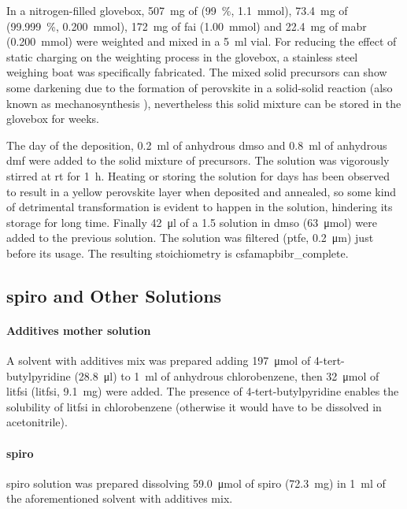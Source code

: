 		In a nitrogen-filled glovebox, \SI{507}{\mg} of  (\SI{99}{\%}, \SI{1.1}{\mmol}), \SI{73.4}{\mg} of  (\SI{99.999}{\%}, \SI{0.200}{\mmol}), \SI{172}{\mg} of \gls{fai} (\SI{1.00}{\mmol}) and \SI{22.4}{\mg} of \gls{mabr} (\SI{0.200}{\mmol}) were weighted and mixed in a \SI{5}{\ml} vial.
		For reducing the effect of static charging on the weighting process in the glovebox, a stainless steel weighing boat was specifically fabricated.
		The mixed solid precursors can show some darkening due to the formation of perovskite in a solid-solid reaction (also known as mechanosynthesis \cite{Prochowicz2018}), nevertheless this solid mixture can be stored in the glovebox for weeks.

		The day of the deposition, \SI{0.2}{\ml} of anhydrous \gls{dmso} and \SI{0.8}{\ml} of anhydrous \gls{dmf} were added to the solid mixture of precursors.
		The solution was vigorously stirred at \gls{rt} for \SI{1}{\hour}.
		Heating or storing the solution for days has been observed to result in a yellow perovskite layer when deposited and annealed, so some kind of detrimental transformation is evident to happen in the solution, hindering its storage for long time.
		Finally \SI{42}{\ul} of	a \SI{1.5}{\Molar}  solution in \gls{dmso} (\SI{63}{\umol}) were added to the previous solution.
		The solution was filtered (\gls{ptfe}, \SI{0.2}{\um}) just before its usage.
		The resulting stoichiometry is \acrshort{csfamapbibr_complete}.

	\subsection{\Gls{spiro} and Other  Solutions}

		\paragraph{Additives mother solution}
		A solvent with additives mix was prepared adding \SI{197}{\umol} of 4-tert-butylpyridine (\SI{28.8}{\ul}) to \SI{1}{\ml} of anhydrous chlorobenzene, then \SI{32}{\umol} of \glsdesc{litfsi} (\gls{litfsi}, \SI{9.1}{\mg}) were added.
		The presence of 4-tert-butylpyridine enables the solubility of \gls{litfsi} in chlorobenzene (otherwise it would have to be dissolved in acetonitrile).

		\paragraph{\Gls{spiro}}
		\Glsdesc{spiro} solution was prepared dissolving \SI{59.0}{\umol} of \gls{spiro} (\SI{72.3}{\mg}) in \SI{1}{\ml} of the aforementioned solvent with additives mix.

